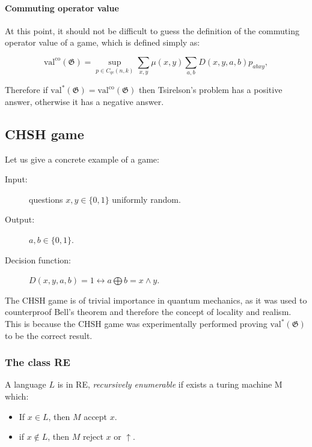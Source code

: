 \paragraph{Commuting operator value}

At this point, it should not be difficult to guess the definition of the commuting operator value of a game, which is defined simply as:

\begin{defn}
    \begin{equation}
    \operatorname{val^\text{co}}(\mathfrak{G})=\sup _{p \in C_{q c}(n, k)} \sum_{x, y} \mu(x, y) \sum_{a, b} D(x, y, a, b) p_{a b x y},
    \end{equation}
\end{defn}

Therefore if $\operatorname{val^{*}}(\mathfrak{G}) = \operatorname{val^\text{co}}(\mathfrak{G})$ then Tsirelson's problem has a positive answer, otherwise it has a negative answer.


\subsection{CHSH game}

Let us give a concrete example of a game:
\begin{description}
\item[Input:]questions $x,y \in \{0,1\}$ uniformly random.
\item[Output:]$a,b \in \{0,1\}$.
\item[Decision function: ]$D(x, y, a, b) = 1 \leftrightarrow a \bigoplus b = x \land y $. 
\end{description}

The CHSH game is of trivial importance in quantum mechanics, as it was used to counterproof Bell's theorem and therefore the concept of locality and realism. This is because the CHSH game was experimentally performed proving $\operatorname{val^{*}}(\mathfrak{G})$ to be the correct result.

\subsubsection{The class RE}

\begin{defn}
A language $L$ is in RE, \emph{recursively enumerable} if exists a turing machine M which:
\begin{itemize}
\item If $x \in L$, then $M$ accept $x$.
\item if $x \notin L$, then $M$ reject $x$ or $\uparrow$.
\end{itemize}
\end{defn}

